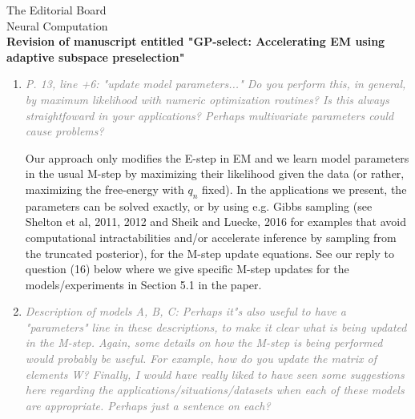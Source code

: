 \documentclass[10pt]{letter}
\newcommand{\rvr}[1]{\textcolor{gray}{#1}}
\begin{document}
\begin{letter}{
The Editorial Board\\
Neural Computation\\
\vspace{10mm}
\textbf{Revision of manuscript entitled "GP-select: Accelerating EM using adaptive
subspace preselection"}
}
\begin{enumerate}[topsep=3pt,itemsep=2ex,partopsep=1ex,parsep=1ex]
    
    Indeed, this is a subtle point, and one we should have been clearer about: we do not use a sigmoid link, but merely do a GP regression of the expected indicator of $s$. This is, of course, not a good estimate of a probability (it can be negative, or greater than one), and we will emphasize this. From the selection perspective, however, it's not really necessary to avoid these pathologies, and to use a sigmoid squashing function, as we only want an ordering of the variables. As you point out, GP classification with a properly defined likelihood will no longer have a marginal Gaussian distribution, and we would no longer be able to trivially express the posterior means of different functions with the same inputs, without considerable extra computation.

See our reply to Reviewer 2, in point (1), who also had questions about this topic.

    \item \rvr{\emph{P. 13, line +6: "update model parameters..."  Do you perform this, in general, by maximum likelihood with numeric optimization routines? Is this always straightfoward in your applications? Perhaps multivariate parameters could cause problems?}}

Our approach only modifies the E-step in EM and we learn model parameters in the usual M-step by maximizing their likelihood given the data (or rather, maximizing the free-energy with $q_n$ fixed). 
In the applications we present, the parameters can be solved exactly, or by using e.g. Gibbs sampling (see Shelton et al, 2011, 2012 and Sheik and Luecke, 2016 for examples that avoid computational intractabilities and/or accelerate inference by sampling from the truncated posterior), for the M-step update equations. See our reply to question (16) below where we give specific M-step updates for the models/experiments in Section 5.1 in the paper.

    \item \rvr{\emph{Description of models A, B, C: Perhaps it"s also useful to have a "parameters"  line in these descriptions, to make it clear what is being updated in the M-step. Again, some details on how the M-step is being performed would probably be useful. For example, how do you update the matrix of elements W? Finally, I would have really liked to have seen some suggestions here regarding the applications/situations/datasets when each of these models are appropriate. Perhaps just a sentence on each?}}


\end{enumerate}
\end{letter}
\end{document}
